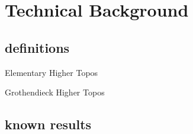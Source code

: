 \documentclass[./main.tex]{subfiles}
\begin{document}
  \section{Technical Background}
  \subsection{definitions}

  \begin{definition}
    Elementary Higher Topos

  \end{definition}
  \begin{definition}
    Grothendieck Higher Topos

  \end{definition}
  \subsection{known results}
\end{document}
